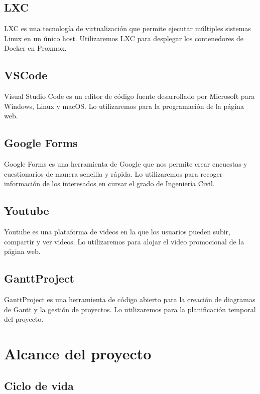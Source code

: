 \documentclass{report}
\begin{document}
        \section*{LXC}
            LXC es una tecnología de virtualización que permite ejecutar múltiples sistemas Linux en un único host. Utilizaremos LXC para desplegar los contenedores de Docker en Proxmox.
        \section*{VSCode}
            Visual Studio Code es un editor de código fuente desarrollado por Microsoft para Windows, Linux y macOS. Lo utilizaremos para la programación de la página web.
        \section*{Google Forms}
            Google Forms es una herramienta de Google que nos permite crear encuestas y cuestionarios de manera sencilla y rápida. Lo utilizaremos para recoger información de los interesados en cursar el grado de Ingeniería Civil.
        \section*{Youtube}
            Youtube es una plataforma de videos en la que los usuarios pueden subir, compartir y ver videos. Lo utilizaremos para alojar el video promocional de la página web.
        \section*{GanttProject}
            GanttProject es una herramienta de código abierto para la creación de diagramas de Gantt y la gestión de proyectos. Lo utilizaremos para la planificación temporal del proyecto.
    \chapter{Alcance del proyecto}
        \section{Ciclo de vida}
\end{document}
